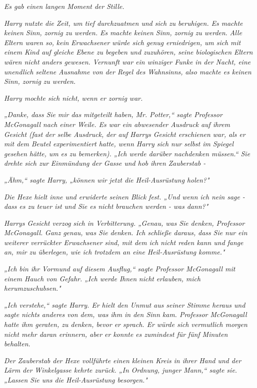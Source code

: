 {\emph{Es gab einen langen Moment der Stille.}

\emph{Harry nutzte die Zeit, um tief durchzuatmen und sich zu beruhigen. Es machte keinen Sinn, zornig zu werden. Es machte keinen Sinn, zornig zu werden.} \emph{\emph{Alle}} \emph{Eltern waren so,} \emph{\emph{kein}} \emph{Erwachsener würde sich genug erniedrigen, um sich mit einem Kind auf gleiche Ebene zu begeben und zuzuhören, seine biologischen Eltern wären nicht anders gewesen. Vernunft war ein winziger Funke in der Nacht, eine unendlich seltene Ausnahme von der Regel des Wahnsinns, also machte es keinen Sinn, zornig zu werden.}

\emph{Harry mochte sich nicht, wenn er zornig war.}

\emph{„Danke, dass Sie mir das mitgeteilt haben, Mr. Potter,“ sagte Professor McGonagall nach einer Weile. Es war ein abwesender Ausdruck auf ihrem Gesicht (fast der selbe Ausdruck, der auf Harrys Gesicht erschienen war, als er mit dem Beutel experimentiert hatte, wenn Harry sich nur selbst im Spiegel gesehen hätte, um es zu bemerken). „Ich werde darüber nachdenken müssen.“ Sie drehte sich zur Einmündung der Gasse und hob ihren Zauberstab -}

\emph{„Ähm,“ sagte Harry, „können wir jetzt die Heil-Ausrüstung holen?"}

\emph{Die Hexe hielt inne und erwiderte seinen Blick fest. „Und wenn ich nein sage - dass es zu teuer ist und Sie es nicht brauchen werden - was dann?"}

\emph{Harrys Gesicht verzog sich in Verbitterung. „Genau, was Sie denken, Professor McGonagall.} \emph{\emph{Ganz genau}\emph{,}} \emph{was Sie denken. Ich schließe daraus, dass Sie nur ein weiterer verrückter Erwachsener sind, mit dem ich nicht reden kann und fange an, mir zu überlegen, wie ich trotzdem an eine Heil-Ausrüstung komme."}

\emph{„Ich bin ihr Vormund auf diesem Ausflug,“ sagte Professor McGonagall mit einem Hauch von Gefahr. „Ich werde Ihnen} \emph{\emph{nicht}} \emph{erlauben, mich herumzuschubsen."}

\emph{„Ich verstehe,“ sagte Harry. Er hielt den Unmut aus seiner Stimme heraus und sagte nichts anderes von dem, was ihm in den Sinn kam. Professor McGonagall hatte ihm geraten, zu denken, bevor er sprach. Er würde sich vermutlich morgen nicht mehr daran erinnern, aber er konnte es zumindest für fünf Minuten behalten.}

\emph{Der Zauberstab der Hexe vollführte einen kleinen Kreis in ihrer Hand und der Lärm der Winkelgasse kehrte zurück. „In Ordnung, junger Mann,“ sagte sie. „Lassen Sie uns die Heil-Ausrüstung besorgen."}

}
